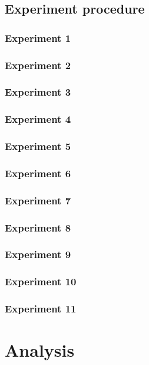\documentclass{article}
\begin{document}
\subsection*{Experiment procedure}
\subsubsection*{Experiment 1}
\subsubsection*{Experiment 2}
\subsubsection*{Experiment 3}
\subsubsection*{Experiment 4}
\subsubsection*{Experiment 5}
\subsubsection*{Experiment 6}
\subsubsection*{Experiment 7}
\subsubsection*{Experiment 8}
\subsubsection*{Experiment 9}
\subsubsection*{Experiment 10}
\subsubsection*{Experiment 11}


\newpage
\section{Analysis}
\end{document}
